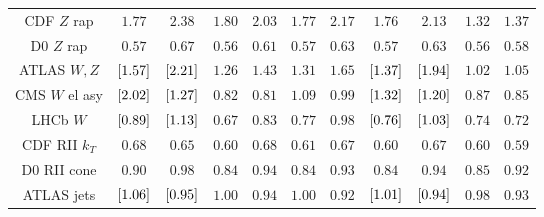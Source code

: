 \begin{tabular}{c||c|c||c|c||c|c||c|c||c|c}
CDF $Z$ rap         & $          1.77      $ & $          2.38      $  &  $          1.80      $  &  $          2.03      $  &  $         1.77      $ &  $         2.17      $ &  $          1.76      $  &  $          2.13      $  &  $          1.32      $  &  $          1.37      $  \\  
D0 $Z$ rap          & $          0.57      $ & $          0.67      $  &  $          0.56      $  &  $          0.61      $  &  $         0.57      $ &  $         0.63      $ &  $          0.57      $  &  $          0.63      $  &  $          0.56      $  &  $          0.58      $  \\  
ATLAS $W,Z$         & $  \left[     1.57 \right]  $ & $  \left[     2.21 \right]  $  &  $          1.26      $  &  $          1.43      $  &  $         1.31      $ &  $         1.65      $ &  $  \left[     1.37 \right]  $  &  $  \left[     1.94 \right]  $  &  $          1.02      $  &  $          1.05      $  \\  
CMS $W$ el asy      & $  \left[     2.02 \right]  $ & $  \left[     1.27 \right]  $  &  $          0.82      $  &  $          0.81      $  &  $         1.09      $ &  $         0.99      $ &  $  \left[     1.32 \right]  $  &  $  \left[     1.20 \right]  $  &  $          0.87      $  &  $          0.85      $  \\  
LHCb $W$            & $  \left[     0.89 \right]  $ & $  \left[     1.13 \right]  $  &  $          0.67      $  &  $          0.83      $  &  $         0.77      $ &  $         0.98      $ &  $  \left[     0.76 \right]  $  &  $  \left[     1.03 \right]  $  &  $          0.74      $  &  $          0.72      $  \\  
 \hline
CDF RII $k_T$       & $          0.68      $ & $          0.65      $  &  $          0.60      $  &  $          0.68      $  &  $         0.61      $ &  $         0.67      $ &  $          0.60      $  &  $          0.67      $  &  $          0.60      $  &  $          0.59      $  \\  
D0 RII cone         & $          0.90      $ & $          0.98      $  &  $          0.84      $  &  $          0.94      $  &  $         0.84      $ &  $         0.93      $ &  $          0.84      $  &  $          0.94      $  &  $          0.85      $  &  $          0.92      $  \\  
ATLAS jets          & $  \left[     1.06 \right]  $ & $  \left[     0.95 \right]  $  &  $          1.00      $  &  $          0.94      $  &  $         1.00      $ &  $         0.92      $ &  $  \left[     1.01 \right]  $  &  $  \left[     0.94 \right]  $  &  $          0.98      $  &  $          0.93      $  \\  


\hline
\end{tabular}



